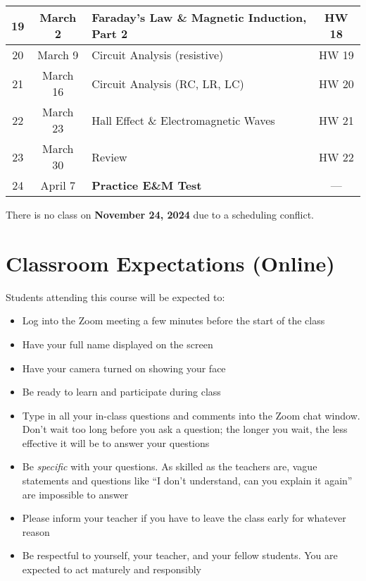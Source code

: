 \documentclass{../../oss-handout}
\begin{document}
\begin{center}
\begin{tabular}{|c|c|p{4in}|c|}
    \hline
    19 & March 2 & Faraday's Law \& Magnetic Induction, Part 2 & HW 18 \\
    \hline
    20 & March 9 & Circuit Analysis (resistive) & HW 19 \\
    \hline
    21 & March 16 & Circuit Analysis (RC, LR, LC) & HW 20 \\
    \hline
    22 & March 23 & Hall Effect \& Electromagnetic Waves & HW 21 \\
    \hline
    23 & March 30 & Review & HW 22 \\
    \hline
    \rowcolor{lightgray!50}
    24 & April 7 & \textbf{Practice E\&M Test} & --- \\
    \hline
  \end{tabular}
\end{center}
\egroup
There is no class on \textbf{November 24, 2024} due to a scheduling conflict.
\newpage

\section{Classroom Expectations (Online)}
Students attending this course will be expected to:
\begin{itemize}[nosep]
\item Log into the Zoom meeting a few minutes before the start of the class
\item Have your full name displayed on the screen
\item Have your camera turned on showing your face
\item Be ready to learn and participate during class
\item Type in all your in-class questions and comments into the Zoom chat
  window. Don't wait too long before you ask a question; the longer you wait,
  the less effective it will be to answer your questions
\item Be \emph{specific} with your questions. As skilled as the teachers are,
  vague statements and questions like ``I don't understand, can you explain it
  again'' are impossible to answer
\item Please inform your teacher if you have to leave the class early for
  whatever reason
\item Be respectful to yourself, your teacher, and your fellow students. You
  are expected to act maturely and responsibly
\end{itemize}
\end{document}
